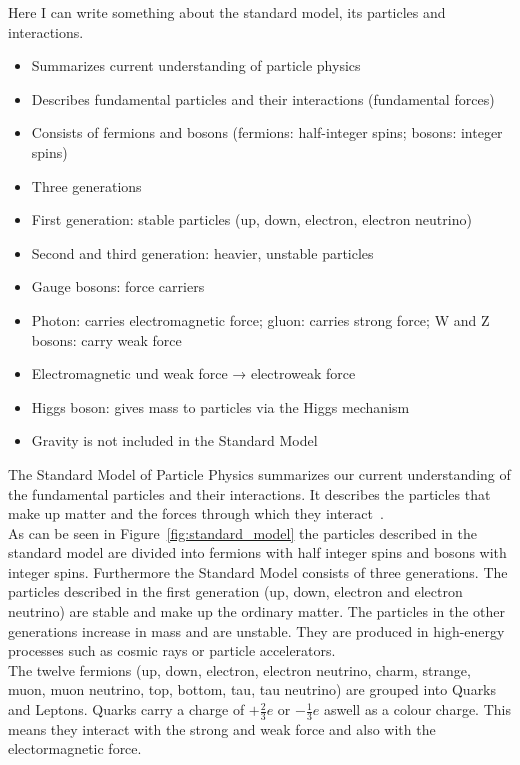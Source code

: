 Here I can write something about the standard model, its particles and interactions.

\begin{itemize}[noitemsep]
    \item Summarizes current understanding of particle physics
    \item Describes fundamental particles and their interactions (fundamental forces)
    \item Consists of fermions and bosons (fermions: half-integer spins; bosons: integer spins)
    \item Three generations
    \item First generation: stable particles (up, down, electron, electron neutrino)
    \item Second and third generation: heavier, unstable particles
    \item Gauge bosons: force carriers
    \item Photon: carries electromagnetic force; gluon: carries strong force; W and Z bosons: carry weak force
    \item Electromagnetic und weak force → electroweak force
    \item Higgs boson: gives mass to particles via the Higgs mechanism
    \item Gravity is not included in the Standard Model
\end{itemize}
The Standard Model of Particle Physics summarizes our current understanding of the fundamental particles and their interactions. 
It describes the particles that make up matter and the forces through which they interact~\cite{thomson2013modern}.\\
As can be seen in Figure~\ref{fig:standard_model} the particles described in the standard model are divided into fermions with half integer spins and bosons with integer spins. 
Furthermore the Standard Model consists of three generations. The particles described in the first generation (up, down, electron and electron neutrino) are stable and make up the ordinary matter. The particles in the other generations increase in mass and are unstable. They are produced in high-energy processes such as cosmic rays or particle accelerators.\\
The twelve  fermions (up, down, electron, electron neutrino, charm, strange, muon, muon neutrino, top, bottom, tau, tau neutrino) are grouped into Quarks and Leptons. 
Quarks carry a charge of $+\frac{2}{3}e$ or $-\frac{1}{3}e$ aswell as a colour charge. This means they interact with the strong and weak force and also with the electormagnetic force. 
